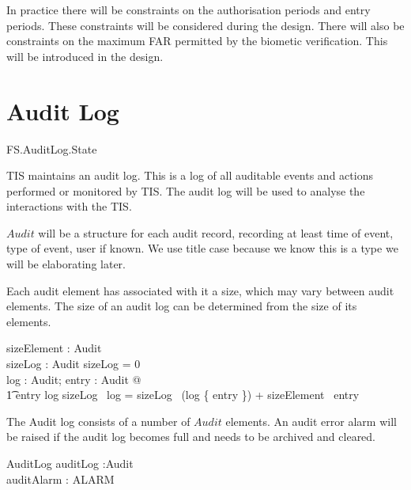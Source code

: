 In practice there will be constraints on the authorisation
periods and entry periods. These constraints will be considered during
the design. There will also be constraints on the maximum FAR
permitted by the biometic verification. This will be introduced in
the design.


\section{Audit Log}

\begin{traceunit}{FS.AuditLog.State}
\end{traceunit}

TIS maintains an audit log. This is a log of all auditable events and
actions performed or monitored by TIS. The audit log will be used to
analyse the interactions with the TIS.

$Audit$ will be a structure for each audit record, 
recording at least time of event, type of event, user if known.
We use title case because we know this is a type we will be elaborating later.
\begin{zed}
	[ Audit ]
\end{zed}

Each audit element has associated with it a size, which may vary
between audit elements. The size of an audit log can be determined
from the size of its elements.

\begin{axdef}
        sizeElement : Audit \fun \nat
\\      sizeLog : \finset Audit \fun \nat
\where
        sizeLog \emptyset = 0
\\      \forall log : \finset Audit; entry : Audit @
\\ \t1  entry \in log \implies sizeLog~ log = sizeLog~ (log
\setminus \{ entry \}) + sizeElement~ entry
\end{axdef}

The Audit log consists of a number of $Audit$ elements. 
An audit error alarm will be raised if the audit log becomes full and
needs to be archived and cleared.

\begin{schema}{AuditLog}
        auditLog :\finset Audit
\\      auditAlarm : ALARM
\end{schema}

